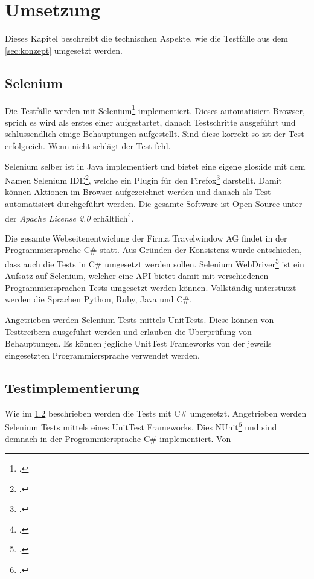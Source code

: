 

\chapter{Umsetzung}
\label{sec:umsetzung}


Dieses Kapitel beschreibt die technischen Aspekte, wie die Testfälle aus dem \cref{sec:konzept}  umgesetzt werden.

\section{Selenium}
\label{sec:umsetzung:selenium}
Die Testfälle werden mit Selenium\footcite{Selenium_-_Web_Browser_Automation_2015-09-26} implementiert. Dieses automatisiert Browser, sprich es wird als erstes einer aufgestartet, danach Testschritte ausgeführt und schlussendlich einige Behauptungen aufgestellt. Sind diese korrekt so ist der Test erfolgreich. Wenn nicht schlägt der Test fehl.

Selenium selber ist in Java implementiert und bietet eine eigene \Gls{glos:ide} mit dem Namen Selenium IDE\footcite{Selenium_IDE_Plugins_2015-09-26}, welche ein Plugin für den Firefox\footcite{Download_Firefox__Free_Web_Browser__Mozilla_2015-09-26} darstellt. Damit können Aktionen im Browser aufgezeichnet werden und danach als Test automatisiert durchgeführt werden. Die gesamte Software ist Open Source unter der \textit{Apache License 2.0} erhältlich\footcite{Selenium_software_-_Wikipedia,_the_free_encyclopedia_2015-09-26}.

Die gesamte Webseitenentwiclung der Firma Travelwindow AG findet in der Programmiersprache C\# statt. Aus Gründen der Konsistenz wurde entschieden, dass auch die Tests in C\# umgesetzt werden sollen. 
Selenium WebDriver\footcite{Selenium_WebDriver_2015-09-26} ist ein Aufsatz auf Selenium, welcher eine API bietet damit mit verschiedenen Programmiersprachen Tests umgesetzt werden können. Vollständig unterstützt werden die Sprachen Python, Ruby, Java und C\#. 

Angetrieben werden Selenium Tests mittels UnitTests. Diese können von Testtreibern ausgeführt werden und erlauben die Überprüfung von Behauptungen. Es können jegliche UnitTest Frameworks von der jeweils eingesetzten Programmiersprache verwendet werden.

\section{Testimplementierung}
\label{sec:umsetzung:selenium}
Wie im \cref{sec:umsetzung:selenium}  beschrieben werden die Tests mit C\# umgesetzt.
Angetrieben werden Selenium Tests mittels eines UnitTest Frameworks. Dies NUnit\footcite{NUnit_-_Home_2015-09-26} und sind demnach in der Programmiersprache C\# implementiert. Von 